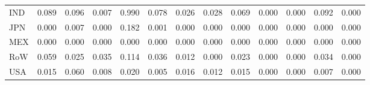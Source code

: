 \begin{table}[htbp]
\begin{tabular}{lcccccccccccc}
  IND & \textcolor[RGB]{17,11,238}{0.089} & \textcolor[RGB]{13,8,242}{0.096} & \textcolor[RGB]{98,63,157}{0.007} & \textcolor[RGB]{0,0,255}{0.990} & \textcolor[RGB]{19,12,236}{0.078} & \textcolor[RGB]{57,37,198}{0.026} & \textcolor[RGB]{55,36,200}{0.028} & \textcolor[RGB]{23,15,232}{0.069} & \textcolor[RGB]{255,165,0}{0.000} & \textcolor[RGB]{255,165,0}{0.000} & \textcolor[RGB]{15,10,240}{0.092} & \textcolor[RGB]{255,165,0}{0.000} \\ 
  JPN & \textcolor[RGB]{255,165,0}{0.000} & \textcolor[RGB]{96,62,159}{0.007} & \textcolor[RGB]{255,165,0}{0.000} & \textcolor[RGB]{2,1,253}{0.182} & \textcolor[RGB]{104,67,151}{0.001} & \textcolor[RGB]{255,165,0}{0.000} & \textcolor[RGB]{255,165,0}{0.000} & \textcolor[RGB]{255,165,0}{0.000} & \textcolor[RGB]{255,165,0}{0.000} & \textcolor[RGB]{255,165,0}{0.000} & \textcolor[RGB]{106,69,149}{0.000} & \textcolor[RGB]{255,165,0}{0.000} \\ 
  MEX & \textcolor[RGB]{255,165,0}{0.000} & \textcolor[RGB]{255,165,0}{0.000} & \textcolor[RGB]{255,165,0}{0.000} & \textcolor[RGB]{255,165,0}{0.000} & \textcolor[RGB]{255,165,0}{0.000} & \textcolor[RGB]{255,165,0}{0.000} & \textcolor[RGB]{255,165,0}{0.000} & \textcolor[RGB]{255,165,0}{0.000} & \textcolor[RGB]{255,165,0}{0.000} & \textcolor[RGB]{255,165,0}{0.000} & \textcolor[RGB]{255,165,0}{0.000} & \textcolor[RGB]{255,165,0}{0.000} \\ 
  RoW & \textcolor[RGB]{30,19,225}{0.059} & \textcolor[RGB]{59,38,196}{0.025} & \textcolor[RGB]{45,29,210}{0.035} & \textcolor[RGB]{6,4,249}{0.114} & \textcolor[RGB]{42,27,212}{0.036} & \textcolor[RGB]{89,58,166}{0.012} & \textcolor[RGB]{110,72,144}{0.000} & \textcolor[RGB]{68,44,187}{0.023} & \textcolor[RGB]{255,165,0}{0.000} & \textcolor[RGB]{255,165,0}{0.000} & \textcolor[RGB]{47,30,208}{0.034} & \textcolor[RGB]{255,165,0}{0.000} \\ 
  USA & \textcolor[RGB]{85,55,170}{0.015} & \textcolor[RGB]{28,18,227}{0.060} & \textcolor[RGB]{91,59,164}{0.008} & \textcolor[RGB]{74,48,181}{0.020} & \textcolor[RGB]{100,65,155}{0.005} & \textcolor[RGB]{79,51,176}{0.016} & \textcolor[RGB]{87,56,168}{0.012} & \textcolor[RGB]{83,54,172}{0.015} & \textcolor[RGB]{255,165,0}{0.000} & \textcolor[RGB]{255,165,0}{0.000} & \textcolor[RGB]{94,61,162}{0.007} & \textcolor[RGB]{255,165,0}{0.000} \\ 
   \hline
\end{tabular}
\end{table}
